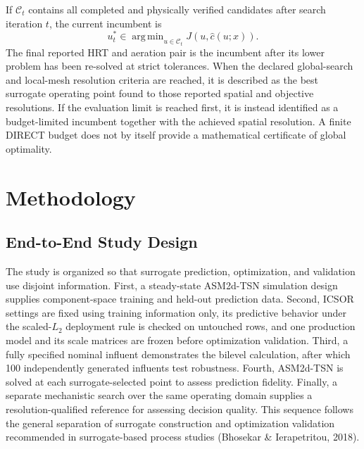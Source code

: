 \documentclass[a4paper,fleqn]{cas-sc}
\DeclareMathOperator*{\argminop}{arg\,min}
\begin{document}
If $\mathcal C_t$ contains all completed and physically verified candidates after search iteration $t$, the current incumbent is
\begin{equation}
\label{eq:incumbent_selection}
u_t^*\in
\argminop_{u\in\mathcal C_t}
J(u,\widehat c(u;x)).
\end{equation}
The final reported HRT and aeration pair is the incumbent after its lower problem has been re-solved at strict tolerances. When the declared global-search and local-mesh resolution criteria are reached, it is described as the best surrogate operating point found to those reported spatial and objective resolutions. If the evaluation limit is reached first, it is instead identified as a budget-limited incumbent together with the achieved spatial resolution. A finite DIRECT budget does not by itself provide a mathematical certificate of global optimality.

\section{Methodology}

\subsection{End-to-End Study Design}

The study is organized so that surrogate prediction, optimization, and validation use disjoint information. First, a steady-state ASM2d-TSN simulation design supplies component-space training and held-out prediction data. Second, ICSOR settings are fixed using training information only, its predictive behavior under the scaled-$L_2$ deployment rule is checked on untouched rows, and one production model and its scale matrices are frozen before optimization validation. Third, a fully specified nominal influent demonstrates the bilevel calculation, after which 100 independently generated influents test robustness. Fourth, ASM2d-TSN is solved at each surrogate-selected point to assess prediction fidelity. Finally, a separate mechanistic search over the same operating domain supplies a resolution-qualified reference for assessing decision quality. This sequence follows the general separation of surrogate construction and optimization validation recommended in surrogate-based process studies (Bhosekar \& Ierapetritou, 2018).
\end{document}
